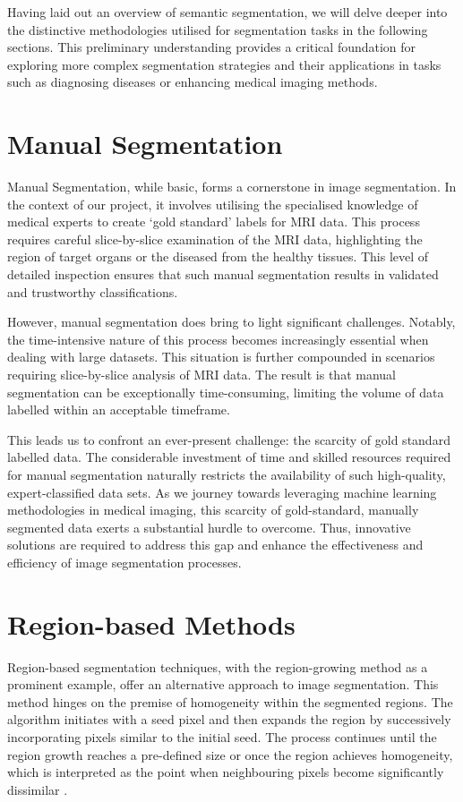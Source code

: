 Having laid out an overview of semantic segmentation, we will delve deeper into the distinctive methodologies utilised for segmentation tasks in the following sections. This preliminary understanding provides a critical foundation for exploring more complex segmentation strategies and their applications in tasks such as diagnosing diseases or enhancing medical imaging methods.

\section{Manual Segmentation}
\label{sec:manual-segmentation}

Manual Segmentation, while basic, forms a cornerstone in image segmentation. In the context of our project, it involves utilising the specialised knowledge of medical experts to create `gold standard' labels for MRI data. This process requires careful slice-by-slice examination of the MRI data, highlighting the region of target organs or the diseased from the healthy tissues. This level of detailed inspection ensures that such manual segmentation results in validated and trustworthy classifications.

However, manual segmentation does bring to light significant challenges. Notably, the time-intensive nature of this process becomes increasingly essential when dealing with large datasets. This situation is further compounded in scenarios requiring slice-by-slice analysis of MRI data. The result is that manual segmentation can be exceptionally time-consuming, limiting the volume of data labelled within an acceptable timeframe.

This leads us to confront an ever-present challenge: the scarcity of gold standard labelled data. The considerable investment of time and skilled resources required for manual segmentation naturally restricts the availability of such high-quality, expert-classified data sets. As we journey towards leveraging machine learning methodologies in medical imaging, this scarcity of gold-standard, manually segmented data exerts a substantial hurdle to overcome. Thus, innovative solutions are required to address this gap and enhance the effectiveness and efficiency of image segmentation processes.

\section{Region-based Methods}
Region-based segmentation techniques, with the region-growing method as a prominent example, offer an alternative approach to image segmentation. This method hinges on the premise of homogeneity within the segmented regions. The algorithm initiates with a seed pixel and then expands the region by successively incorporating pixels similar to the initial seed. The process continues until the region growth reaches a pre-defined size or once the region achieves homogeneity, which is interpreted as the point when neighbouring pixels become significantly dissimilar \cite{adams1994seeded}.

